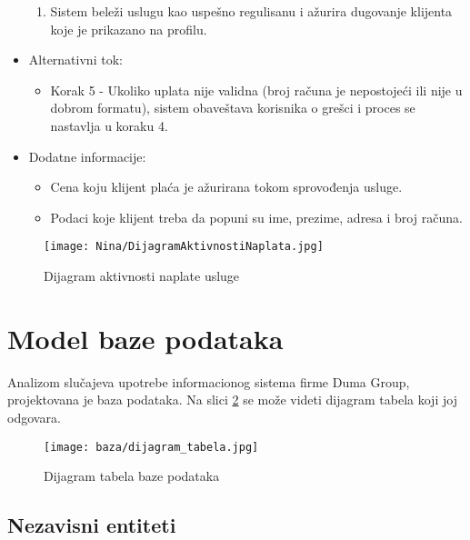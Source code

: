 \documentclass[a4paper]{article}
\begin{document}
\begin{itemize}
\begin{enumerate}
            \item Sistem beleži uslugu kao uspešno regulisanu i ažurira dugovanje klijenta koje je prikazano na profilu.
        \end{enumerate}
    \item Alternativni tok:
        \begin{itemize}
            \item Korak 5 - Ukoliko uplata nije validna (broj računa je nepostojeći ili nije u dobrom formatu), sistem obaveštava korisnika o grešci i proces se nastavlja u koraku 4.  
    \end{itemize}
    \item Dodatne informacije:
        \begin{itemize}
            \item Cena koju klijent plaća je ažurirana tokom sprovođenja usluge.
            \item Podaci koje klijent treba da popuni su ime, prezime, adresa i broj računa.
        \end{itemize}
\end{itemize}

\begin{figure}[H]
    \centering
    \texttt{[image: Nina/DijagramAktivnostiNaplata.jpg]}
    \caption{Dijagram aktivnosti naplate usluge}
    \label{fig:RegistracijaZ}
\end{figure}

\section{Model baze podataka}

Analizom slučajeva upotrebe informacionog sistema firme Duma Group, projektovana je baza podataka. Na slici \ref{fig:dijagramTabela}  se može videti dijagram tabela koji joj odgovara.

\begin{figure}[H]
    \centering
    \texttt{[image: baza/dijagram\_tabela.jpg]}
    \caption{Dijagram tabela baze podataka}
    \label{fig:dijagramTabela}
\end{figure}

\subsection{Nezavisni entiteti}
\end{document}
